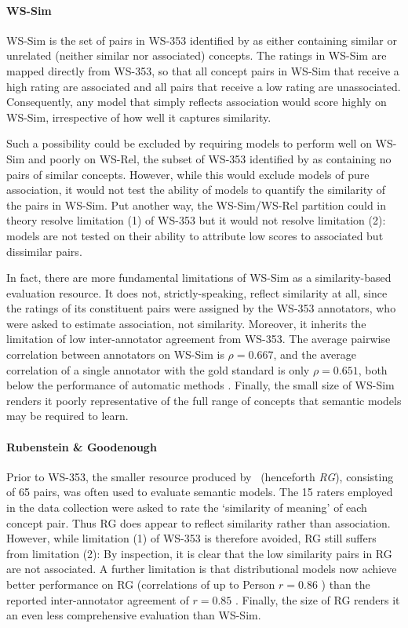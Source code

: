 \paragraph{\bf WS-Sim} WS-Sim is the set of pairs in WS-353 identified by \cite{agirre2009study} as either containing similar or unrelated (neither similar nor associated) concepts. The ratings in WS-Sim are mapped directly from WS-353, so that all concept pairs in WS-Sim that receive a high rating are associated and all pairs that receive a low rating are unassociated. Consequently, any model that simply reflects association would score highly on WS-Sim, irrespective of how well it captures similarity. 

Such a possibility could be excluded by requiring models to perform well on WS-Sim and poorly on WS-Rel, the subset of WS-353 identified by \cite{agirre2009study} as containing no pairs of similar concepts. However, while this would exclude models of pure association, it would not test the ability of models to quantify the similarity of the pairs in WS-Sim. Put another way, the WS-Sim/WS-Rel partition could in theory resolve limitation (1) of WS-353 but it would not resolve limitation (2): models are not tested on their ability to attribute low scores to associated but dissimilar pairs. 

In fact, there are more fundamental limitations of WS-Sim as a similarity-based evaluation resource. It does not, strictly-speaking, reflect similarity at all, since the ratings of its constituent pairs were assigned by the WS-353 annotators, who were asked to estimate association, not similarity. Moreover, it inherits the limitation of low inter-annotator agreement from WS-353. The average pairwise correlation between annotators on WS-Sim is \( \rho = 0.667\), and the average correlation of a single annotator with the gold standard is only \( \rho = 0.651\), both below the performance of automatic methods \citep{agirre2009study}. Finally, the small size of WS-Sim renders it poorly representative of the full range of concepts that semantic models may be required to learn. 

\paragraph{\bf Rubenstein \& Goodenough} Prior to WS-353, the smaller resource produced by~\cite{rubenstein1965contextual} (henceforth \emph{RG}), consisting of 65 pairs, was often used to evaluate semantic models. The 15 raters employed in the data collection were asked to rate the `similarity of meaning' of each concept pair. Thus RG does appear to reflect similarity rather than association. However, while limitation (1) of WS-353 is therefore avoided, RG still suffers from limitation (2): By inspection, it is clear that the low similarity pairs in RG are not associated. A further limitation is that distributional models now achieve better performance on RG (correlations of up to Person \( r = 0.86 \) \citep{hassan2011semantic}) than the reported inter-annotator agreement of \( r = 0.85 \) \citep{rubenstein1965contextual}. Finally, the size of RG renders it an even less comprehensive evaluation than WS-Sim. 

